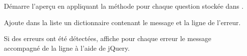 \documentclass[a4,10pt,french]{sphinxmanual}
\begin{document}
\begin{fulllineitems}
\begin{fulllineitems}
\end{fulllineitems}


\begin{fulllineitems}
\label{front-end:Parse.render}
Démarre l'aperçu en appliquant la méthode  pour chaque
question stockée dans .

\end{fulllineitems}


\begin{fulllineitems}
\label{front-end:Parse.error}
Ajoute dans la liste  un dictionnaire contenant le message
et la ligne de l'erreur.

\end{fulllineitems}


\begin{fulllineitems}
\label{front-end:Parse.show_errors}
Si des erreurs ont été détectées, affiche pour chaque erreur le message
accompagné de la ligne à l'aide de jQuery.

\end{fulllineitems}


\end{fulllineitems}

\end{document}
